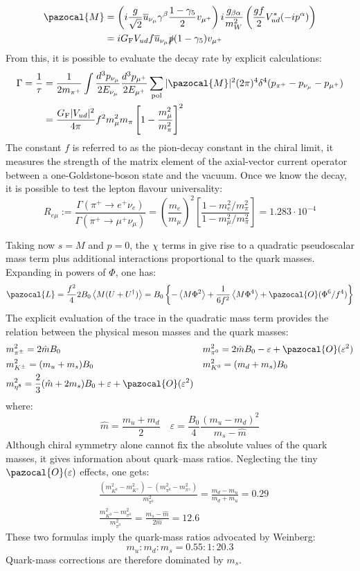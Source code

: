 \documentclass[../main.tex]{subfiles}
\begin{document}
\begin{kaobox}[frametitle=Charged Pion Decay]
\begin{align*}
\pazocal{M}&=\left(i\frac{g}{\sqrt{2}}\overline{u}_{\nu_\mu}\gamma^\beta\frac{1-\gamma_5}{2}v_{\mu^+}\right)i\frac{g_{\beta\alpha}}{m_W^2}\left(\frac{gf}{2}V_{ud}^*(-ip^\alpha)\right)\\
&=iG_{\text{F}}V_{ud}f\overline{u}_{\nu_\mu}\slashed{p}(1-\gamma_5)v_{\mu^+}
\end{align*}
From this, it is possible to evaluate the decay rate by explicit calculations:
\begin{align*}
\Gamma=\frac{1}{\tau}&=\frac{1}{2m_{\pi^+}}\int\frac{d^3p_{\nu_\mu}}{2E_{\nu_\mu}}\frac{d^3p_{\mu^+}}{2E_{\mu^+}}\sum_{\text{pol}}|\pazocal{M}|^2(2\pi)^4\delta^4(p_{\pi^+}-p_{\nu_\mu}-p_{\mu^+})\\
&=\frac{G_{\text{F}}|V_{ud}|^2}{4\pi}f^2m_\mu^2m_\pi\left[1-\frac{m_\mu^2}{m_\pi^2}\right]^2
\end{align*}
The constant $f$ is referred to as the pion-decay constant in the chiral limit, it measures the strength of the matrix element of the axial-vector current
operator between a one-Goldstone-boson state and the vacuum. Once we know the decay, it is possible to test the lepton flavour universality:
\[
R_{e\mu}:=\frac{\Gamma(\pi^+\to e^+\nu_e)}{\Gamma(\pi^+\to\mu^+\nu_\mu)}=\left(\frac{m_e}{m_\mu}\right)^2\left[\frac{1-m_e^2/m_\pi^2}{1-m_\mu^2/m_\pi^2}\right]=1.283\cdot10^{-4}
\]
\end{kaobox}
Taking now $s=M$ and $p=0$, the $\chi$ terms in  give rise to a
quadratic pseudoscalar mass term plus additional interactions proportional to the quark masses. Expanding in powers of $\Phi$, one has:
\[
\pazocal{L}=\frac{f^2}{4}2B_0\Braket{M(U+U^\dagger)}=B_0\left\{-\Braket{M\Phi^2}+\frac{1}{6f^2}\Braket{M\Phi^4}+\pazocal{O}(\Phi^6/f^4)\right\}
\]
The explicit evaluation of the trace in the quadratic mass term provides the relation between the physical meson masses and the quark masses:
\[
\begin{aligned}
&m_{\pi^\pm}^2=2\hat{m}B_0 &&m_{\pi^0}^2=2\hat{m}B_0-\varepsilon+\pazocal{O}(\varepsilon^2)\\
&m_{K^\pm}^2=(m_u+m_s)B_0 &&m_{K^0}^2=(m_d+m_s)B_0\\
&m_{\eta^8}^2=\frac{2}{3}(\hat{m}+2m_s)B_0+\varepsilon+\pazocal{O}(\varepsilon^2)
\end{aligned}
\]
where:
\[
\hat{m}=\frac{m_u+m_d}{2} \quad \varepsilon=\frac{B_0}{4}\frac{(m_u-m_d)^2}{m_s-\hat{m}}
\]
Although chiral symmetry alone cannot fix the absolute values of the
quark masses, it gives information about quark–mass ratios. Neglecting
the tiny $\pazocal{O}(\varepsilon)$ effects, one gets:
\[
\begin{aligned}
&\frac{(m_{K^0}^2-m_{K^+}^2)-(m_{\pi^0}^2-m_{\pi^\pm}^2)}{m_{\pi^0}^2}=\frac{m_d-m_u}{m_d+m_u}=0.29\\
&\frac{m_{K^0}^2-m_{\pi^0}^2}{m_{\pi^0}^2}=\frac{m_s-\hat{m}}{2\hat{m}}=12.6
\end{aligned}
\]
These two formulas imply the quark-mass ratios advocated by Weinberg:
\[
m_u:m_d:m_s=0.55:1:20.3
\]
Quark-mass corrections are therefore dominated by $m_s$.
\end{document}
